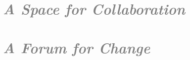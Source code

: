 \documentclass[a4paper, 12pt]{article}
\begin{document}
\section*{\textcolor{gray}{\it A Space for Collaboration}}

\section*{\textcolor{gray}{\it A Forum for Change}}




\end{document}
